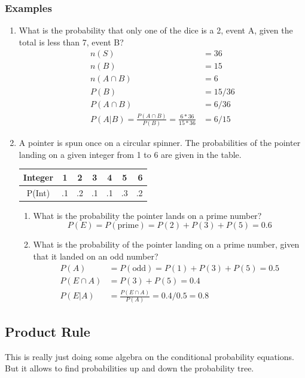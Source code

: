\documentclass[14pt]{extarticle}
\begin{document}
\subsubsection{Examples}
\begin{enumerate}
	\item What is the probability that only one of the dice is a 2, event A, given the total is less than 7, event B?
	\begin{align*}
		n(S) &= 36 \\
		n(B) &= 15 \\
		n(A \cap B) &= 6 \\
		P(B) &= 15/36  \\
		P(A\cap B)&= 6/36 \\
		P(A|B) = \frac{P(A\cap B)}{P(B)} = \frac{6*36}{15*36} &= 6/15
	\end{align*}

	\item A pointer is spun once on a circular spinner. The probabilities of the pointer landing on a given integer from 1 to 6 are given in the table.
	\\
	\begin{tabular}{|c|c|c|c|c|c|r|}
		\hline
		Integer & 1 & 2 & 3 & 4 & 5 & 6 \\
		\hline
		P(Int) & .1 & .2 & .1 & .1 & .3 & .2 \\
		\hline
	\end{tabular}
	\begin{enumerate}
		\item What is the probability the pointer lands on a prime number?
		$$P(E) = P(\text{prime}) = P(2) +P(3)+P(5) = 0.6$$
		\item What is the probability of the pointer landing on a prime number, given that it landed on an odd number?
		\begin{align*}
			P(A) &= P(\text{odd})=P(1)+P(3)+P(5) = 0.5 \\
			P(E\cap A) &= P(3)+P(5) = 0.4 \\
			P(E|A) &= \frac{P(E\cap A)}{P(A)} = 0.4/0.5 = 0.8
		\end{align*}
	\end{enumerate}
\end{enumerate}

\subsection{Product Rule}
This is really just doing some algebra on the conditional probability equations. But it allows to find probabilities up and down the probability tree.
\end{document}
